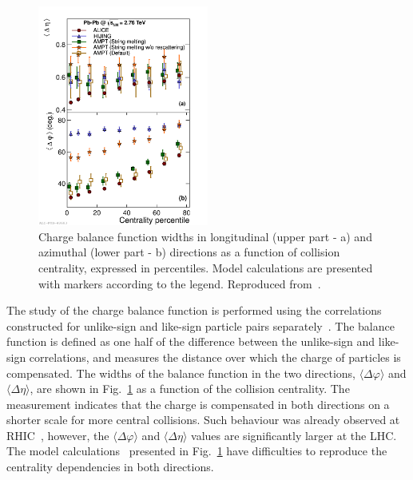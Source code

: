 \begin{figure}
\centering
\includegraphics[width=0.5\textwidth]{ksfigures/BalanceFunctionWidth.pdf}
\caption{Charge balance function widths in longitudinal (upper part - a) and azimuthal (lower part - b) directions as a function of collision centrality, expressed in percentiles. Model calculations are presented with markers according to the legend. Reproduced from~\cite{Abelev:2013csa}.}
\label{figks:Balance}
\end{figure}

The study of the charge balance function is performed using the correlations constructed for unlike-sign and like-sign particle pairs separately~\cite{Abelev:2013csa}. The balance function is defined as one half of the difference between the unlike-sign and like-sign correlations, and measures the distance over which the charge of particles is compensated. The widths of the balance function in the two directions, $\langle \Delta\varphi \rangle$ and $\langle \Delta\eta \rangle$, are shown in Fig.~\ref{figks:Balance} as a function of the collision centrality. The measurement indicates that the charge is compensated in both directions on a shorter scale for more central collisions. Such behaviour was already observed at RHIC~\cite{Aggarwal:2010ya}, however, the $\langle \Delta\varphi \rangle$ and $\langle \Delta\eta \rangle$ values are significantly larger at the LHC. The model calculations~\cite{Wang:1991hta,Lin:2004en} presented in Fig.~\ref{figks:Balance} have difficulties to reproduce the centrality dependencies in both directions.


